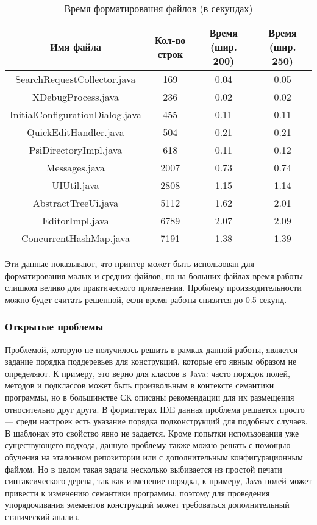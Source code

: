 \begin{table}[h!]
	\centering

    \begin{tabular}{c c c c}
    Имя файла & Кол-во строк & Время (шир. 200) & Время (шир. 250) \\
    \hline
    SearchRequestCollector.java & 169 & 0.04 & 0.05\\
    XDebugProcess.java & 236 & 0.02 & 0.02\\
    InitialConfigurationDialog.java & 455 & 0.11 & 0.11 \\
    QuickEditHandler.java & 504 & 0.21 & 0.21\\
    PsiDirectoryImpl.java & 618 & 0.11 & 0.12\\
    \hline
    Messages.java & 2007 & 0.73 & 0.74 \\
    UIUtil.java & 2808 & 1.15 & 1.14 \\
    AbstractTreeUi.java & 5112 & 1.62 & 2.01 \\
    EditorImpl.java & 6789 & 2.07 & 2.09\\
    ConcurrentHashMap.java & 7191 & 1.38 & 1.39
    \end{tabular}

  \caption{Время форматирования файлов (в секундах)}
	\label{tbl:pluginPerformanceTbl}
\end{table}

Эти данные показывают, что принтер может быть использован для
форматирования малых и средних файлов, но на больших файлах время
работы слишком велико для практического применения. Проблему производительности
можно будет считать решенной, если время работы снизится до 0.5 секунд.

\subsubsection{Открытые проблемы}

Проблемой, которую не получилось решить в рамках данной работы,
является задание порядка поддеревьев для конструкций, которые
его явным образом не определяют. К примеру, это верно для классов в Java:
часто порядок полей, методов и подклассов может быть произвольным в контексте
семантики программы, но в большинстве СК описаны рекомендации для их размещения
относительно друг друга. В форматтерах IDE данная проблема решается просто ---
среди настроек есть указание порядка подконструкций для подобных случаев.
В шаблонах это свойство явно не задается. Кроме попытки использования
уже существующего подхода, данную проблему также можно 
решать с помощью обучения на эталонном репозитории или с дополнительным
конфигурационным файлом. Но в целом такая задача несколько выбивается из
простой печати синтаксического дерева, так как изменение порядка, к примеру,
Java-полей может привести к изменению семантики программы, поэтому для проведения
упорядочивания элементов конструкций может требоваться дополнительный статический
анализ.
